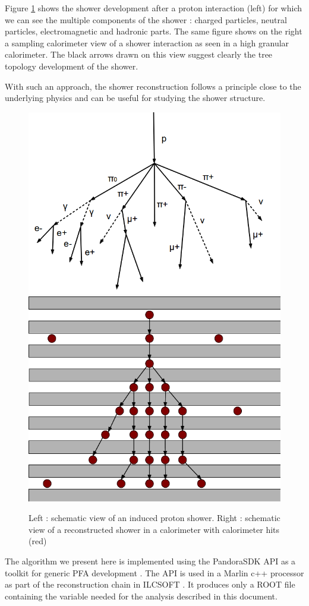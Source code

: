 \documentclass[cits]{JINST}
\begin{document}
Figure \ref{ARBOR_STRUCTURE} shows the shower development after a proton interaction (left) for which we can see the multiple components of the shower : charged particles, neutral particles, electromagnetic and hadronic parts.
The same figure shows on the right a sampling calorimeter view of a shower interaction as seen in a high granular calorimeter. The black arrows drawn on this view suggest clearly the tree topology development of the shower.

With such an approach, the shower reconstruction follows a principle close to the underlying physics and can be useful for studying the shower structure. 
  
\begin{figure}[!ht]
  \begin{center}
    \includegraphics[width=0.45\linewidth]{ProtonDecay.png} \hfill
    \includegraphics[width=0.45\linewidth]{ArborSchema.png}
  \end{center}
  \caption{\label{ARBOR_STRUCTURE} Left : schematic view of an induced proton shower. Right : schematic view of a reconstructed shower in a calorimeter with calorimeter hits (red)}
\end{figure}

The algorithm we present here is implemented using the PandoraSDK API as a toolkit for generic PFA development \cite{pandora-sdk}. The API is used in a Marlin \cite{marlin-lccd} c++ processor as part of the reconstruction chain in ILCSOFT \cite{ilcsoft}. It produces only a ROOT \cite{root} file containing the variable needed for the analysis described in this document.
\end{document}
